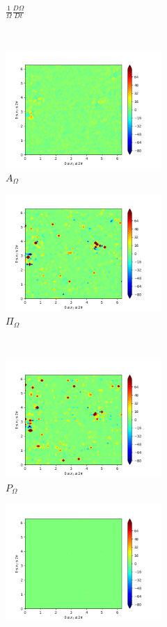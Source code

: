 \begin{figure}[H]
\begin{subfigure}[H]{0.45\textwidth}
        \caption{$\frac{1}{\Omega} \frac{D \Omega}{Dt}$}
    \end{subfigure}
    ~
    \begin{subfigure}{0.45\textwidth}
        \includegraphics[height=1.75in]{media/run-cds-65/A-enst-1460.png}
        \caption{$A_{\Omega}$}
    \end{subfigure}
    \newline
    \begin{subfigure}{0.45\textwidth}
        \includegraphics[height=1.75in]{media/run-cds-65/Pi-enst-1460.png}
        \caption{$\Pi_{\Omega}$}
    \end{subfigure}
    ~
    \begin{subfigure}{0.45\textwidth}
        \includegraphics[height=1.75in]{media/run-cds-65/P-enst-1460.png}
        \caption{$P_{\Omega}$}
    \end{subfigure}
    \newline
    \begin{subfigure}{0.45\textwidth}
        \includegraphics[height=1.75in]{media/run-cds-65/B-enst-1460.png}

\end{subfigure}
\end{figure}
